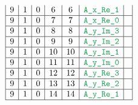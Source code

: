 \begin{figure}[h!]
\begin{adjustwidth}{-2cm}{-2cm}
{\[\begin{array}{|c|c|c|c|c|c|c|}
                    9                      & 1                                       & 0                                         & 6                      & 6                   & \locAXReOne   &                                                                      \\ \hline
                    9                      & 1                                       & 0                                         & 7                      & 7                   & \locAXReZero  &                                                                      \\ \hline
                    9                      & 1                                       & 0                                         & 8                      & 8                   & \locAYImThree &                                                                      \\ \hline
                    9                      & 1                                       & 0                                         & 9                      & 9                   & \locAYImTwo   &                                                                      \\ \hline
                    9                      & 1                                       & 0                                         & 10                     & 10                  & \locAYImOne   &                                                                      \\ \hline
                    9                      & 1                                       & 0                                         & 11                     & 11                  & \locAYImZero  &                                                                      \\ \hline
                    9                      & 1                                       & 0                                         & 12                     & 12                  & \locAYReThree &                                                                      \\ \hline
                    9                      & 1                                       & 0                                         & 13                     & 13                  & \locAYReTwo   &                                                                      \\ \hline
                    9                      & 1                                       & 0                                         & 14                     & 14                  & \locAYReOne   &                                                                      \\ \hline

\end{array}\]}
\end{adjustwidth}
\end{figure}
